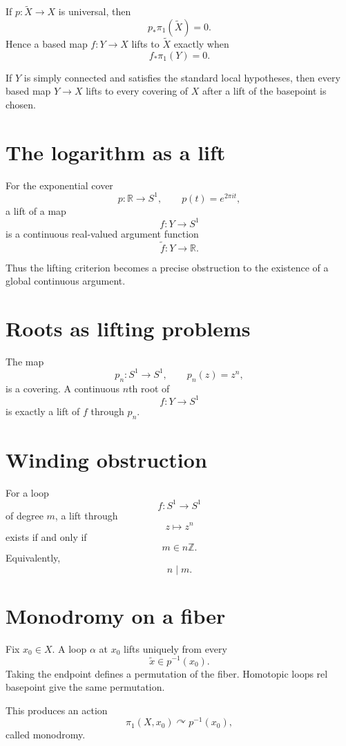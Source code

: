 If \(p:\widetilde X\to X\) is universal, then
\[
p_*\pi_1(\widetilde X)=0.
\]
Hence a based map \(f:Y\to X\) lifts to \(\widetilde X\) exactly when
\[
f_*\pi_1(Y)=0.
\]

\begin{corollary}
\label{cor:viii11-simply-connected-domain}
If \(Y\) is simply connected and satisfies the standard local hypotheses, then
every based map \(Y\to X\) lifts to every covering of \(X\) after a lift of the
basepoint is chosen.
\end{corollary}

\section{The logarithm as a lift}

For the exponential cover
\[
p:\mathbb R\to S^1,\qquad p(t)=e^{2\pi it},
\]
a lift of a map
\[
f:Y\to S^1
\]
is a continuous real-valued argument function
\[
\widetilde f:Y\to\mathbb R.
\]

Thus the lifting criterion becomes a precise obstruction to the existence of a
global continuous argument.

\section{Roots as lifting problems}

The map
\[
p_n:S^1\to S^1,\qquad p_n(z)=z^n,
\]
is a covering.  A continuous \(n\)th root of
\[
f:Y\to S^1
\]
is exactly a lift of \(f\) through \(p_n\).

\section{Winding obstruction}

For a loop
\[
f:S^1\to S^1
\]
of degree \(m\), a lift through
\[
z\mapsto z^n
\]
exists if and only if
\[
m\in n\mathbb Z.
\]
Equivalently,
\[
n\mid m.
\]

\section{Monodromy on a fiber}

Fix \(x_0\in X\).  A loop \(\alpha\) at \(x_0\) lifts uniquely from every
\[
\tilde x\in p^{-1}(x_0).
\]
Taking the endpoint defines a permutation of the fiber.  Homotopic loops rel
basepoint give the same permutation.

This produces an action
\[
\pi_1(X,x_0)\curvearrowright p^{-1}(x_0),
\]
called monodromy.

